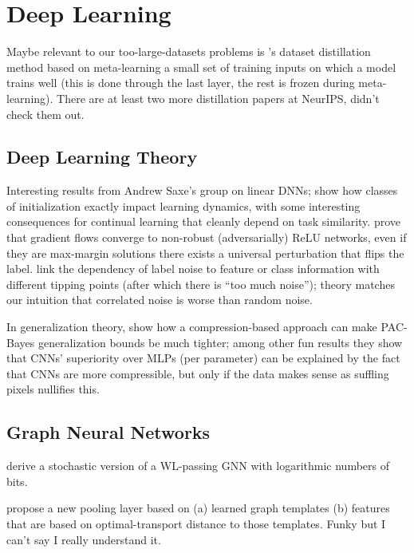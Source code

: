 \section{Deep Learning}

Maybe relevant to our too-large-datasets problems is \citet{zhou2022dataset}'s dataset distillation method based on meta-learning a small set of training inputs on which a model trains well (this is done through the last layer, the rest is frozen during meta-learning). There are at least two more distillation papers at NeurIPS, didn't check them out.

\subsection{Deep Learning Theory}

Interesting results from Andrew Saxe's group on linear DNNs; \citet{braun2022exact} show how classes of initialization exactly impact learning dynamics, with some interesting consequences for continual learning that cleanly depend on task similarity. \citet{vardi2022gradient} prove that gradient flows converge to non-robust (adversarially) ReLU networks, even if they are max-margin solutions there exists a universal perturbation that flips the label. \citet{oyen2022robustness} link the dependency of label noise to feature or class information with different tipping points (after which there is ``too much noise''); theory matches our intuition that correlated noise is worse than random noise.

In generalization theory, \citet{lotfi2022pacbayes} show how a compression-based approach can make PAC-Bayes generalization bounds be much tighter; among other fun results they show that CNNs' superiority over MLPs (per parameter) can be explained by the fact that CNNs are more compressible, but only if the data makes sense as suffling pixels nullifies this.

\subsection{Graph Neural Networks}

\citet{aamand2022exponentially} derive a stochastic version of a WL-passing GNN with logarithmic numbers of bits.

\citet{vincent-cuaz2022template} propose a new pooling layer based on (a) learned graph templates (b) features that are based on optimal-transport distance to those templates. Funky but I can't say I really understand it.

